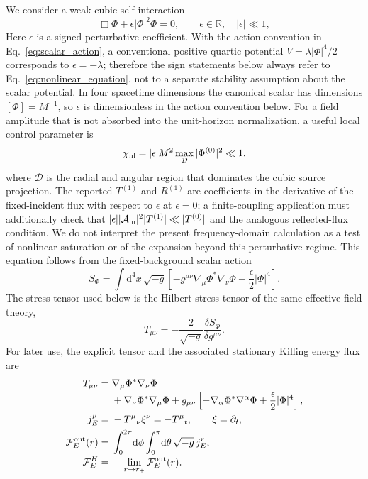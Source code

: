 \documentclass[aps,prd,twocolumn,10pt,nofootinbib,superscriptaddress,floatfix]{revtex4-2}
\newcommand{\dd}{\mathrm{d}}
\begin{document}
We consider a weak cubic self-interaction
\begin{equation}
\Box\Phi+\epsilon|\Phi|^2\Phi=0,\qquad \epsilon\in\mathbb R,\quad |\epsilon|\ll1,
\label{eq:nonlinear_equation}
\end{equation}
Here $\epsilon$ is a signed perturbative coefficient.  With the action
convention in Eq.~\eqref{eq:scalar_action}, a conventional positive quartic
potential $V=\lambda|\Phi|^4/2$ corresponds to $\epsilon=-\lambda$; therefore
the sign statements below always refer to Eq.~\eqref{eq:nonlinear_equation},
not to a separate stability assumption about the scalar potential.
In four spacetime dimensions the canonical scalar has dimensions
$[\Phi]=M^{-1}$, so $\epsilon$ is dimensionless in the action convention below.
For a field amplitude that is not absorbed into the unit-horizon normalization,
a useful local control parameter is
\begin{equation}
\chi_{\rm nl}=|\epsilon|M^2\max_{\mathcal D}|\Phi^{(0)}|^2\ll1,
\label{eq:nonlinear_control}
\end{equation}
where $\mathcal D$ is the radial and angular region that dominates the cubic
source projection.  The reported $T^{(1)}$ and $R^{(1)}$ are coefficients in the
derivative of the fixed-incident flux with respect to $\epsilon$ at
$\epsilon=0$; a finite-coupling application must additionally check that
$|\epsilon| |{\cal A}_{\rm in}|^2|T^{(1)}|\ll|T^{(0)}|$ and the analogous
reflected-flux condition.
We do not interpret the present frequency-domain calculation as a test of
nonlinear saturation or of the expansion beyond this perturbative regime.
This equation follows from the fixed-background scalar action
\begin{equation}
S_\Phi=\int\dd^4x\,\sqrt{-g}\left[
-g^{\mu\nu}\nabla_\mu\Phi^*\nabla_\nu\Phi
+\frac{\epsilon}{2}|\Phi|^4\right] .
\label{eq:scalar_action}
\end{equation}
The stress tensor used below is the Hilbert stress tensor of the same effective
field theory,
\begin{equation}
T_{\mu\nu}=-\frac{2}{\sqrt{-g}}\frac{\delta S_\Phi}{\delta g^{\mu\nu}} .
\label{eq:stress_tensor}
\end{equation}
For later use, the explicit tensor and the associated stationary Killing
energy flux are
\begin{align}
T_{\mu\nu}={}&\nabla_\mu\Phi^*\nabla_\nu\Phi \\[-2pt]
&+\nabla_\nu\Phi^*\nabla_\mu\Phi
 +g_{\mu\nu}\left[-\nabla_\alpha\Phi^*\nabla^\alpha\Phi
 +\frac{\epsilon}{2}|\Phi|^4\right],
\label{eq:stress_tensor_explicit}\\
j_E^\mu={}&-T^\mu{}_{\nu}\xi^\nu=-T^\mu{}_t,\qquad \xi=\partial_t,
\nonumber\\
\mathcal F_E^{\rm out}(r)={}&\int_0^{2\pi}\!\dd\phi\int_0^\pi\!\dd\theta\,
\sqrt{-g}\,j_E^r, \\[-2pt]
\mathcal F_E^H={}&-\lim_{r\to r_+}\mathcal F_E^{\rm out}(r).
\label{eq:energy_flux}
\end{align}
\end{document}
